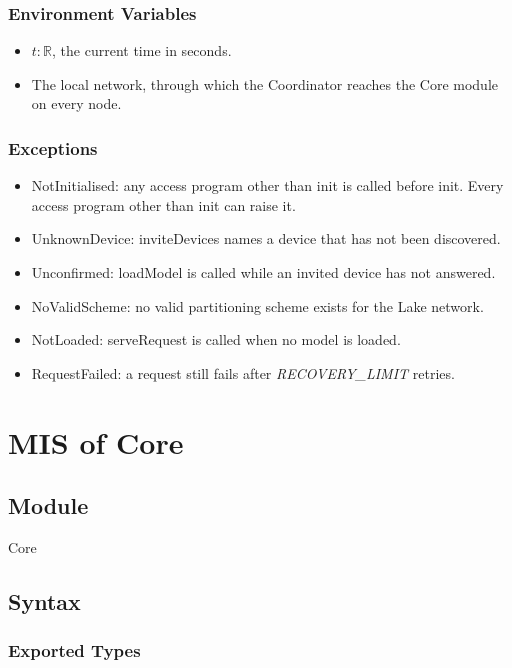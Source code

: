\documentclass[12pt, titlepage]{article}
\begin{document}
\subsubsection{Environment Variables}

\begin{itemize}
  \item $t: \mathbb{R}$, the current time in seconds.
  \item The local network, through which the Coordinator reaches the Core
    module on every node.
\end{itemize}

\subsubsection{Exceptions}

\begin{itemize}
  \item NotInitialised: any access program other than init is called before
    init. Every access program other than init can raise it.
  \item UnknownDevice: inviteDevices names a device that has not been discovered.
  \item Unconfirmed: loadModel is called while an invited device has not answered.
  \item NoValidScheme: no valid partitioning scheme exists for the Lake network.
  \item NotLoaded: serveRequest is called when no model is loaded.
  \item RequestFailed: a request still fails after \textit{RECOVERY\_LIMIT}
    retries.
\end{itemize}

\newpage

\section{MIS of Core} \label{mis:core}

\subsection{Module}

Core

\subsection{Syntax}

\subsubsection{Exported Types}
\end{document}
